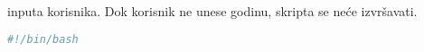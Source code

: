 \documentclass{exam}
\begin{document}
\begin{itemize}
                                                                        inputa
                                                                        korisnika.
                                                                        Dok
                                                                        korisnik
                                                                        ne unese
                                                                        godinu,
                                                                        skripta
                                                                        se neće
                                                                        izvršavati.
                                                                        \begin{lstlisting}[language=bash,caption={Čitanje
                                                                        inputa}]
                                                                        #!/bin/bash
                                                                        echo -n
                                                                        "Upisi
                                                                        godinu
                                                                        za koju
                                                                        te
                                                                        zanima
                                                                        koliko
                                                                        puta se
                                                                        dogodio
                                                                        petak
                                                                        13.: "
                                                                        read
                                                                        godina;


\end{lstlisting}
\end{itemize}
\end{document}
